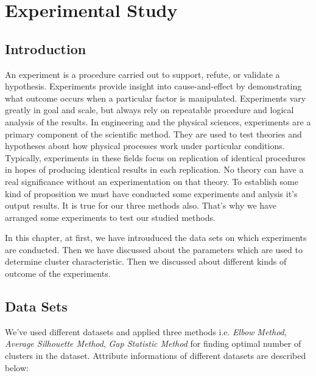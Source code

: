 \chapter{Experimental Study}\label{expstudy}

\section{Introduction}
An experiment is a procedure carried out to support, refute, or validate a hypothesis. Experiments
provide insight into cause-and-effect by demonstrating what outcome occurs when
a particular factor is manipulated. Experiments vary greatly in goal and scale, but always rely
on repeatable procedure and logical analysis of the results. In engineering and the physical
sciences, experiments are a primary component of the scientific method. They are used to
test theories and hypotheses about how physical processes work under particular conditions.
Typically, experiments in these fields focus on replication of identical procedures in hopes of
producing identical results in each replication. No theory can have a real significance without
an experimentation on that theory. To establish some kind of proposition we must have conducted
some experiments and anlysis it’s output results. It is true for our three methods also.
That’s why we have arranged some experiments to test our studied methods.

In this chapter, at first, we have introuduced the data sets on which experiments are conducted.
Then we have discussed about the parameters which are used to determine cluster characteristic.
Then we discussed about different kinds of outcome of the experiments.

\section{Data Sets}
We've used different datasets and applied three methods i.e. \textit{Elbow Method}, \textit{Average Silhouette Method},
\textit{Gap Statistic Method} for finding optimal number of clusters in the dataset. Attribute informations of different datasets are described below:

